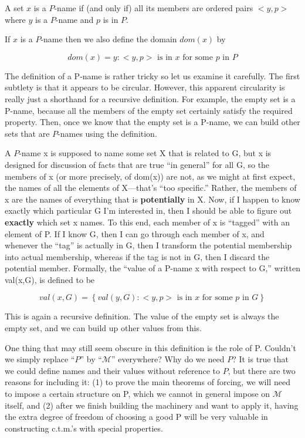 \documentclass[10pt]{article}
\begin{document}
 A set $x$ is a $P$-name if (and only if) all its members are
 ordered pairs $<y,p>$ where $y$ is a $P$-name and $p$ is in $P$.

If $x$ is a $P$-name then we also define the domain $dom(x)$ by

 $$dom(x) = {y : <y,p>\text{ is in }x\text{ for some }p\text{ in }P}$$

The definition of a P-name is rather tricky so let us examine it carefully. The first subtlety is that it appears to be circular. However, this apparent circularity is really just a shorthand for a recursive definition. For example, the empty set is a P-name, because all the members of the empty set certainly satisfy the required property. Then, once we know that the empty set is a P-name, we can build other sets that are $P$-names using the definition.

A $P$-name x is supposed to name some set X that is related to G, but x is designed for discussion of facts that are true ``in general'' for all G, so the members of x (or more precisely, of dom(x)) are not, as we might at first expect, the names of all the elements of X---that's ``too specific.'' Rather, the members of x are the names of everything that is \textbf{potentially} in X. Now, if I happen to know exactly which particular G I'm interested in, then I should be able to figure out \textbf{exactly} which set x names. To this end, each member of x is ``tagged'' with an element of P. If I know G, then I can go through each member of x, and whenever the ``tag'' is actually in G, then I transform the potential membership into actual membership, whereas if the tag is not in G, then I discard the potential member. Formally, the ``value of a P-name x with respect to G,'' written val(x,G), is defined to be

$$val(x,G) =\left\{val(y,G) : <y,p>\text{ is in }x\text{ for some }p\text{ in }G\right\}$$

This is again a recursive definition. The value of the empty set is always the empty set, and we can build up other values from this.

One thing that may still seem obscure in this definition is the role of P. Couldn't we simply replace ``$P$'' by ``$\mathcal M$'' everywhere? Why do we need $P$? It is true that we could define names and their values without reference to $P$, but there are two reasons for including it: (1) to prove the main theorems of forcing, we will need to impose a certain structure on P, which we cannot in general impose on $\mathcal{M}$ itself, and (2) after we finish building the machinery and want to apply it, having the extra degree of freedom of choosing a good P will be very valuable in constructing c.t.m.'s with special properties.
\end{document}

